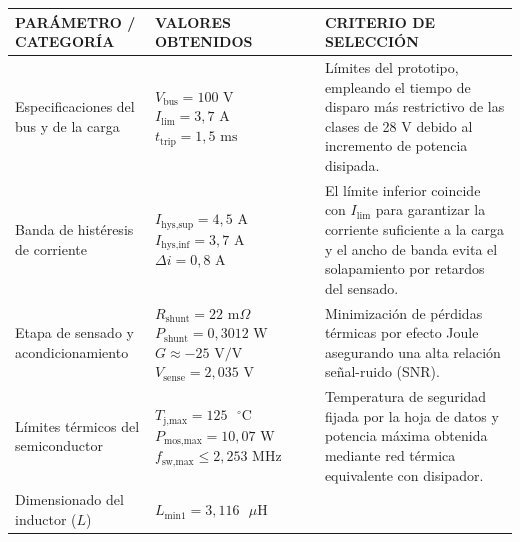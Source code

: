 \documentclass[12pt]{report} %
\begin{document}
\begin{table}[H]
    \centering
    \fontsize{10}{12}\selectfont
    {\begin{tabular}{|P{3.2cm}|P{3.5cm}|P{5.8cm}|}
        \hline
        \textbf{PARÁMETRO / CATEGORÍA} & \textbf{VALORES OBTENIDOS} & \textbf{CRITERIO DE SELECCIÓN} \\
        \hline
        Especificaciones del bus y de la carga & 
        $V_\text{bus} = 100\text{ V}$ \newline 
        $I_\text{lim} = 3{,}7\text{ A}$ \newline 
        $t_\text{trip} = 1{,}5\text{ ms}$ & 
        Límites del prototipo, empleando el tiempo de disparo más restrictivo de las clases de 28 V debido al incremento de potencia disipada. \\
        \hline
        Banda de histéresis de corriente & 
        $I_\text{hys,sup} = 4{,}5\text{ A}$ \newline 
        $I_\text{hys,inf} = 3{,}7\text{ A}$ \newline 
        $\Delta i = 0{,}8\text{ A}$ & 
        El límite inferior coincide con $I_\text{lim}$ para garantizar la corriente suficiente a la carga y el ancho de banda evita el solapamiento por retardos del sensado. \\
        \hline
        Etapa de sensado y acondicionamiento & 
        $R_\text{shunt} = 22\text{ m}\Omega$ \newline 
        $P_\text{shunt} = 0{,}3012\text{ W}$ \newline 
        $G \approx -25\text{ V/V}$ \newline
        $V_\text{sense} = 2{,}035\text{ V}$ & 
        Minimización de pérdidas térmicas por efecto Joule asegurando una alta relación señal-ruido (SNR). \\
        \hline
        Límites térmicos del semiconductor & 
        $T_\text{j,max} = 125\text{ }^\circ\text{C}$ \newline 
        $P_\text{mos,max} = 10{,}07\text{ W}$ \newline 
        $f_\text{sw,max} \le 2{,}253\text{ MHz}$ & 
        Temperatura de seguridad fijada por la hoja de datos y potencia máxima obtenida mediante red térmica equivalente con disipador. \\
        \hline
        Dimensionado del inductor ($L$) & 
        $L_\text{min1} = 3{,}116\text{ }\mu\text{H}$ \newline 

\end{tabular}}
\end{table}
\end{document}
